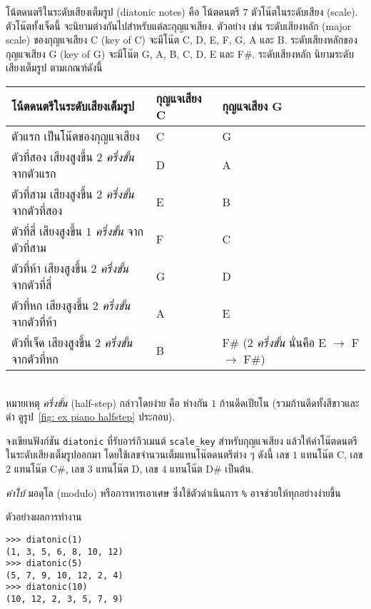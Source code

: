 


\begin{Exercise}
	\label{prog file musical diatonic}


โน้ตดนตรีในระดับเสียงเต็มรูป (diatonic notes) คือ โน้ตดนตรี $7$ ตัวโน๊ตในระดับเสียง (scale).
ตัวโน๊ตทั้งเจ็ดนี้ จะนิยามต่างกันไปสำหรับแต่ละกุญแจเสียง.
ตัวอย่าง เช่น ระดับเสียงหลัก (major scale) ของกุญแจเสียง C (key of C) จะมีโน๊ต C, D, E, F, G, A และ  B.
ระดับเสียงหลักของกุญแจเสียง G (key of G) จะมีโน๊ต G, A, B, C, D, E และ  F\#.
ระดับเสียงหลัก นิยามระดับเสียงเต็มรูป ตามเกณฑ์ดังนี้
 
\begin{tabular}{|l|l|l|}
	\hline 
โน้ตดนตรีในระดับเสียงเต็มรูป &  กุญแจเสียง C & กุญแจเสียง G \\ 
	\hline 
ตัวแรก เป็นโน๊ตของกุญแจเสียง	&  C & G \\ 
	\hline 
ตัวที่สอง เสียงสูงขึ้น $2$ \textit{ครึ่งขั้น} จากตัวแรก	&  D & A \\ 
\hline 
ตัวที่สาม เสียงสูงขึ้น $2$ \textit{ครึ่งขั้น} จากตัวที่สอง	&  E & B\\ 
\hline 
ตัวที่สี่ เสียงสูงขึ้น $1$ \textit{ครึ่งขั้น} จากตัวที่สาม	&  F 
& C 
\\ 
\hline 
ตัวที่ห้า เสียงสูงขึ้น $2$ \textit{ครึ่งขั้น} จากตัวที่สี่	&  G & D \\ 
\hline 
ตัวที่หก เสียงสูงขึ้น $2$ \textit{ครึ่งขั้น} จากตัวที่ห้า	&  A & E\\ 
\hline 
ตัวที่เจ็ด เสียงสูงขึ้น $2$ \textit{ครึ่งขั้น} จากตัวที่หก	&  B & F\# ($2$ \textit{ครึ่งขั้น} นั่นคือ E $\rightarrow$ F $\rightarrow$ F\#) \\ 
\hline 
\end{tabular} 
\\
หมายเหตุ \textit{ครึ่งขั้น} (half-step) กล่าวโดยง่าย คือ ห่างกัน $1$ ก้านดีดเปียโน 
(รวมก้านดีดทั้งสีขาวและดำ ดูรูป~\ref{fig: ex piano halfstep} ประกอบ).

จงเขียนฟังก์ชัน \texttt{diatonic} ที่รับอาร์กิวเมนต์ \verb|scale_key| สำหรับกุญแจเสียง 
แล้วให้ค่าโน๊ตดนตรีในระดับเสียงเต็มรูปออกมา โดยใช้เลขจำนวนเต็มแทนโน๊ตดนตรีต่าง ๆ ดังนี้
เลข $1$ แทนโน๊ต C,
เลข $2$ แทนโน๊ต C\#,
เลข $3$ แทนโน๊ต D,
เลข $4$ แทนโน๊ต D\# เป็นต้น.

\textit{คำใบ้} มอดุโล (modulo) หรือการหารเอาเศษ ซึ่งใช้ตัวดำเนินการ \verb|%| อาจช่วยให้ทุกอย่างง่ายขึ้น

ตัวอย่างผลการทำงาน
\begin{verbatim}
>>> diatonic(1)
(1, 3, 5, 6, 8, 10, 12)
>>> diatonic(5)
(5, 7, 9, 10, 12, 2, 4)
>>> diatonic(10)
(10, 12, 2, 3, 5, 7, 9)
\end{verbatim}

\end{Exercise}

